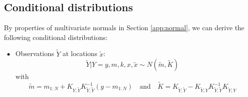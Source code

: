 \documentclass{article}
\newcommand{\1}{\mathbbm{1}}
\begin{document}
\subsection{Conditional distributions}

By properties of multivariate normals in Section \ref{app:normal}, 
we can derive the following conditional distributions:
\begin{itemize}
\item Observations $\tilde{Y}$ at locations $\tilde{x}$:
\[
\tilde{Y}|Y=y,m,k,x,\tilde{x} \sim N\left(\tilde{m},\tilde{K}\right)
\]
with 
\[
\tilde{m} = m_{1:N} + K_{Y,\tilde{Y}}K_{\tilde{Y},\tilde{Y}}^{-1}(y-m_{1:N}) 
\quad \mbox{and} \quad
\tilde{K} = K_{\tilde{Y},\tilde{Y}} - K_{\tilde{Y},Y}K_{\tilde{Y},\tilde{Y}}^{-1}K_{\tilde{Y},Y}
\]
\end{itemize}



\end{document}
